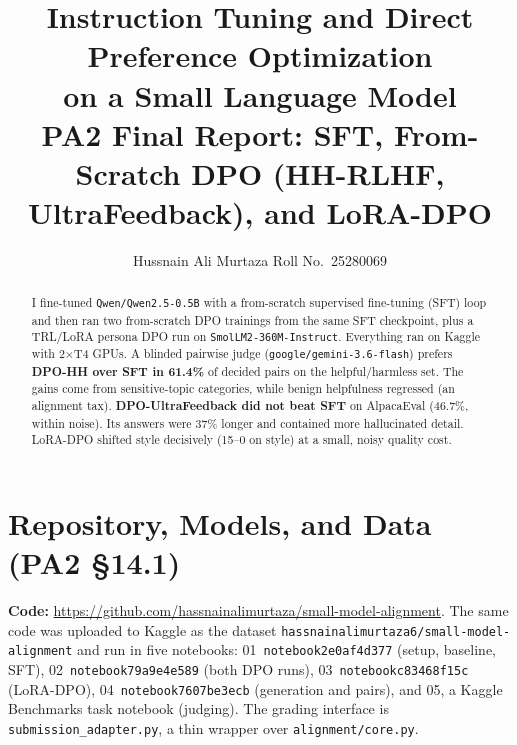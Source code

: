 \documentclass[10pt,a4paper]{article}
\title{\vspace{-1.2cm}\textbf{Instruction Tuning and Direct Preference Optimization\\on a Small Language Model}\\[2pt]
\large PA2 Final Report: SFT, From-Scratch DPO (HH-RLHF, UltraFeedback), and LoRA-DPO}
\author{Hussnain Ali Murtaza \quad Roll No.\ 25280069}
\date{}
\newcommand{\repourl}{\url{https://github.com/hassnainalimurtaza/small-model-alignment}}
\begin{document}
\maketitle
\vspace{-1.0cm}

\begin{abstract}
\noindent I fine-tuned \texttt{Qwen/Qwen2.5-0.5B} with a from-scratch supervised fine-tuning (SFT) loop and then ran two from-scratch DPO trainings from the same SFT checkpoint, plus a TRL/LoRA persona DPO run on \texttt{SmolLM2-360M-Instruct}. Everything ran on Kaggle with 2$\times$T4 GPUs. A blinded pairwise judge (\texttt{google/gemini-3.6-flash}) prefers \textbf{DPO-HH over SFT in 61.4\%} of decided pairs on the helpful/harmless set. The gains come from sensitive-topic categories, while benign helpfulness regressed (an alignment tax). \textbf{DPO-UltraFeedback did not beat SFT} on AlpacaEval (46.7\%, within noise). Its answers were 37\% longer and contained more hallucinated detail. LoRA-DPO shifted style decisively (15--0 on style) at a small, noisy quality cost.
\end{abstract}

\section{Repository, Models, and Data (PA2 \S14.1)}
\textbf{Code:} \repourl. The same code was uploaded to Kaggle as the dataset \texttt{hassnainalimurtaza6/small-model-alignment} and run in five notebooks: 01~\texttt{notebook2e0af4d377} (setup, baseline, SFT), 02~\texttt{notebook79a9e4e589} (both DPO runs), 03~\texttt{notebookc83468f15c} (LoRA-DPO), 04~\texttt{notebook7607be3ecb} (generation and pairs), and 05, a Kaggle Benchmarks task notebook (judging). The grading interface is \texttt{submission\_adapter.py}, a thin wrapper over \texttt{alignment/core.py}.
\end{document}
